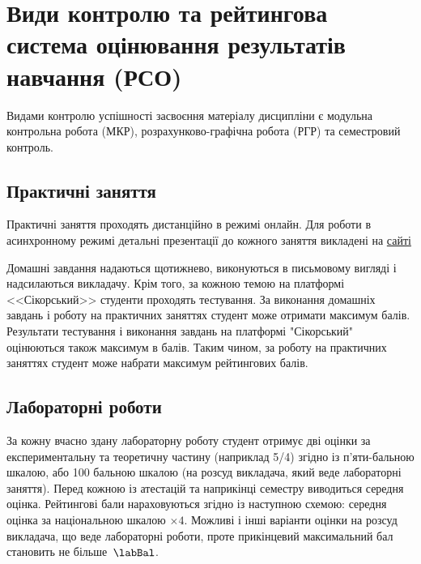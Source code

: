 \documentclass{Syllabus}
\begin{document}
\section{Види контролю та рейтингова система оцінювання результатів навчання (РСО)}

%

Видами контролю успішності засвоєння матеріалу дисципліни є  модульна контрольна робота (МКР), розрахунково-графічна робота (РГР) та семестровий контроль.


\subsection*{Практичні заняття}


\pgfmathsetmacro{\pracBal}{\rob + \promTest}
Практичні заняття проходять дистанційно в режимі онлайн. Для роботи в асинхронному режимі  детальні презентації до кожного заняття викладені на  \href{https://do.ipo.kpi.ua/enrol/index.php?id=1988}{сайті}

Домашні завдання надаються щотижнево, виконуються в письмовому вигляді і надсилаються викладачу. Крім того, за кожною темою на платформі <<Сікорський>> студенти проходять тестування. За виконання домашніх завдань і роботу на практичних заняттях студент може отримати максимум \rob{} балів. Результати тестування і виконання завдань на платформі "Сікорський" оцінюються також максимум в \promTest{} балів. Таким чином, за роботу на практичних заняттях студент може набрати максимум \pracBal{} рейтингових балів.


\subsection*{Лабораторні роботи}

За кожну вчасно здану лабораторну роботу студент отримує дві оцінки за експериментальну та теоретичну частину (наприклад 5/4) згідно із п'яти-бальною шкалою, або 100 бальною шкалою (на розсуд викладача, який веде лабораторні заняття). Перед кожною із атестацій та наприкінці семестру виводиться середня оцінка. Рейтингові бали нараховуються згідно із наступною схемою: середня оцінка за національною шкалою $\times 4$. Можливі і інші варіанти оцінки на розсуд викладача, що веде лабораторні роботи, проте прикінцевий максимальний бал становить не більше~$\labBal$.
\end{document}
